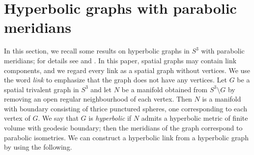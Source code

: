 \documentclass[reqno]{amsproc}  %
\begin{document}
\section{Hyperbolic graphs with parabolic meridians}\label{sec.Vol}
In this section, we recall some results on hyperbolic graphs in $S^3$ with parabolic meridians; 
for details see \cite{HHMP} and \cite{Mas}.
In this paper, spatial graphs may contain link components, and we regard every link as a spatial graph without vertices.
We use the word {\em link} to emphasize that the graph does not have any vertices.
Let $G$ be a spatial trivalent graph in $S^3$ and let $N$ be a manifold obtained from $S^3\setminus G$ 
by removing an open regular neighbourhood of each vertex.
Then $N$ is a manifold with boundary consisting of thrice punctured spheres, one corresponding to each vertex of $G$. We say that
$G$ is {\em hyperbolic} if $N$ admits a hyperbolic metric of finite volume with geodesic boundary;
then the meridians of the graph correspond to parabolic isometries.
We can construct a hyperbolic link from a hyperbolic graph by using the following.
\end{document}
